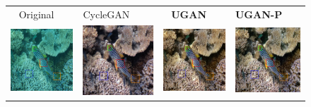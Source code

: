 \documentclass[letterpaper, 10pt, conference]{ieeeconf}
\begin{document}
\begin{figure}
\centering
\begin{tabular}{p{4.0cm} p{4.0cm} p{4.0cm} p{4.0cm}}
  
   \qquad \qquad ~ Original & \qquad \qquad CycleGAN & \qquad \qquad ~ \textbf{UGAN} & \qquad \qquad \textbf{UGAN-P} \\

   \includegraphics[width=1.7in]{flickr_cmp} &
   \includegraphics[width=1.7in]{cgan_cmp} &
   \includegraphics[width=1.7in]{ugan_cmp} &
   \includegraphics[width=1.7in]{uganp_cmp} \\ [-11ex]
   
\end{tabular}
\end{figure}
\end{document}
